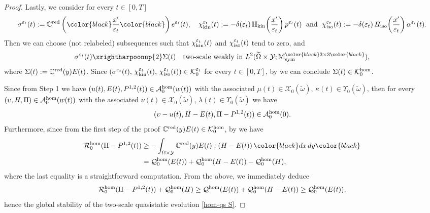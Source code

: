 \documentclass[reqno,10pt]{amsart}
\numberwithin{equation}{section}
\theoremstyle{remark}
\newcommand{\RED}{\color{black}}
\newcommand{\BLACK}{\color{black}}
\newcommand{\PINK}{\color{black}}
\newcommand{\calA}{\mathcal{A}}
\newcommand{\C}{\mathbb{C}}
\newcommand{\calK}{\mathcal{K}}
\newcommand{\M}{\mathbb{M}}
\newcommand{\calQ}{\mathcal{Q}}
\newcommand{\calR}{\mathcal{R}}
\newcommand{\calY}{\mathcal{Y}}
\DeclareMathOperator{\sym}{sym}
\newcommand{\weaktwoscale}{\xrightharpoonup{2}}
\newcommand{\eps}{\varepsilon}
\newcommand{\calXzero}[1]{\mathcal{X}_0({#1})}
\newcommand{\calYzero}[1]{\Upsilon_0({#1})}
\newcommand{\ext}[1]{\widetilde{#1}}
\newcommand{\Hkin}{\mathbb{H}_{\rm kin}}
\newcommand{\Hiso}{H_{\rm iso}}
\newcommand{\chikin}{\chi_{\rm kin}}
\newcommand{\chiiso}{\chi_{\rm iso}}
\newcommand{\red}[1]{#1^{\rm red}}
\begin{document}
\begin{proof}
Lastly, we consider for every $t \in [0,T]$
\begin{equation*}
	\sigma^{\eps_t}(t) := \red{\C}\left({\RED\frac{x'}{\eps_t}\BLACK}\right) e^{\eps_t}(t),
	\quad \chikin^{\eps_t}(t) := - \delta(\eps_t)\,\Hkin\!\left(\frac{x'}{\eps_t}\right) p^{\eps_t}(t)
	\;\text{ and }\; \chiiso^{\eps_t}(t) := - \delta(\eps_t)\,\Hiso\!\left(\frac{x'}{\eps_t}\right) \alpha^{\eps_t}(t).
\end{equation*}
Then we can choose (not relabeled) subsequences such that $\chikin^{\eps_t}(t)$ and {\RED$\chiiso^{\eps_t}(t)$\BLACK} tend to zero, and
\begin{equation} \label{main result sigma^eps(t)}
	\sigma^{\eps_t}(t) \weaktwoscale \Sigma(t) \quad \text{two-scale weakly in $L^2(\ext{\Omega} \times \calY;\M^{{\RED 3 \times 3 \BLACK}}_{\sym})$},
\end{equation}
where $\Sigma(t) := \red{\C}(y) E(t)$. 
Since $(\sigma^{\eps_t}(t),\, \chikin^{\eps_t}(t),\, \chiiso^{\eps_t}(t)) \in \calK^{\eps_t}_{0}$ for every $t \in [0,T]$, by  we can conclude $\Sigma(t) \in \calK^{\rm hom}_{0}$. 


Since from Step 1 we have $(u(t),E(t),P^{1,2}(t)) \in \calA^{\rm hom}_{0}(w(t)) $ with the associated $\mu(t) \in \calXzero{\ext{\omega}}$, $\kappa(t) \in \calYzero{\ext{\omega}}$, then for every $(\upsilon,H,\Pi) \in \calA^{\rm hom}_{0}(w(t)) $ with the associated $\nu(t) \in \calXzero{\ext{\omega}}$, $\lambda(t) \in \calYzero{\ext{\omega}}$ we have
\begin{equation*}
	(\upsilon-u(t),H-E(t),\Pi-P^{1,2}(t)) \in \calA^{\rm hom}_{0}(0).
\end{equation*}
Furthermore, since from the first step of the proof $\red{\C}(y) E(t) \in \calK^{\rm hom}_{0}$, by  we have 
\begin{align*}
	\calR^{\rm hom}_{0}(\Pi-P^{1,2}(t)) & \geq -\int_{\Omega \times \calY} \red{\C}(y) E(t) : (H-E(t)) \,{\PINK dx\,dy\BLACK}\\
	& = \calQ^{\rm hom}_{0}(E(t)) + \calQ^{\rm hom}_{0}(H-E(t)) - \calQ^{\rm hom}_{0}(H),
\end{align*}
where the last equality is a straightforward computation. 
From the above, we immediately deduce
\begin{equation*}
	\calR^{\rm hom}_{0}(\Pi-P^{1,2}(t)) + \calQ^{\rm hom}_{0}(H) \geq \calQ^{\rm hom}(E(t)) + \calQ^{\rm hom}_{0}(H-E(t)) \geq \calQ^{\rm hom}_{0}(E(t)),
\end{equation*}
hence the global stability of the two-scale quasistatic evolution \ref{hom-qs S}.


\end{proof}
\end{document}
